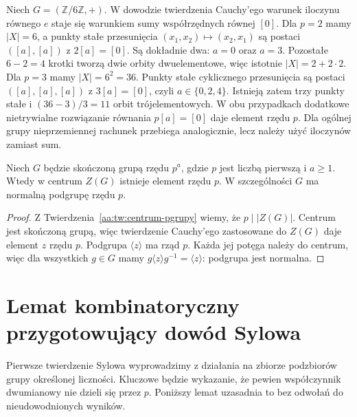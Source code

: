 \begin{przyklad}
\label{aa:prz:cauchy-z6}
Niech $G=(\mathbb Z/6\mathbb Z,+)$.
W dowodzie twierdzenia Cauchy'ego warunek iloczynu równego
$e$ staje się warunkiem sumy współrzędnych równej $[0]$.
Dla $p=2$ mamy $|X|=6$, a punkty stałe przesunięcia
$(x_1,x_2)\mapsto(x_2,x_1)$ są postaci $([a],[a])$
z $2[a]=[0]$. Są dokładnie dwa: $a=0$ oraz $a=3$.
Pozostałe $6-2=4$ krotki tworzą dwie orbity dwuelementowe,
więc istotnie $|X|=2+2\cdot2$.
Dla $p=3$ mamy $|X|=6^2=36$.
Punkty stałe cyklicznego przesunięcia są postaci
$([a],[a],[a])$ z $3[a]=[0]$, czyli $a\in\{0,2,4\}$.
Istnieją zatem trzy punkty stałe i
$(36-3)/3=11$ orbit trójelementowych.
W obu przypadkach dodatkowe nietrywialne rozwiązanie
równania $p[a]=[0]$ daje element rzędu $p$.
Dla ogólnej grupy nieprzemiennej rachunek przebiega
analogicznie, lecz należy użyć iloczynów zamiast sum.
\end{przyklad}

\begin{wniosek}
\label{aa:wn:central-p}
Niech $G$ będzie skończoną grupą rzędu $p^a$, gdzie
$p$ jest liczbą pierwszą i $a\ge1$.
Wtedy w centrum $Z(G)$ istnieje element rzędu $p$.
W szczególności $G$ ma normalną podgrupę rzędu $p$.
\end{wniosek}
\begin{proof}
Z Twierdzenia~\ref{aa:tw:centrum-pgrupy} wiemy,
że $p\mid|Z(G)|$. Centrum jest skończoną grupą,
więc twierdzenie Cauchy'ego zastosowane do $Z(G)$
daje element $z$ rzędu $p$.
Podgrupa $\langle z\rangle$ ma rząd $p$.
Każda jej potęga należy do centrum, więc dla wszystkich
$g\in G$ mamy $g\langle z\rangle g^{-1}=\langle z\rangle$:
podgrupa jest normalna.
\end{proof}

\section{Lemat kombinatoryczny przygotowujący dowód Sylowa}
Pierwsze twierdzenie Sylowa wyprowadzimy z działania
na zbiorze podzbiorów grupy określonej liczności.
Kluczowe będzie wykazanie, że pewien współczynnik
dwumianowy nie dzieli się przez $p$. Poniższy lemat
uzasadnia to bez odwołań do nieudowodnionych wyników.

